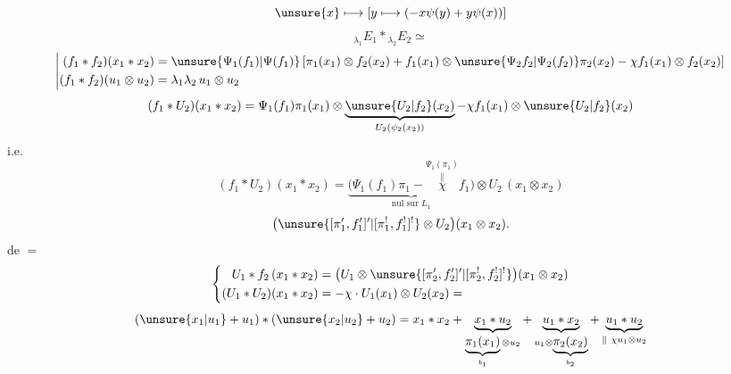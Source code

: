 \[
\unsure{x}\longmapsto
\left[y\longmapsto(-x\psi(y)+y\psi(x))\right]
\]
\[
{}_{\lambda_1}E_1*{}_{\lambda_2}E_2\simeq
\]
\[
\left|\begin{aligned}
(f_1*f_2)(x_1*x_2)&=\unsure{\Psi_1(f_1)|\Psi(f_1)}
\left[\pi_1(x_1)\otimes f_2(x_2)+f_1(x_1)\otimes
\unsure{\Psi_2 f_2|\Psi_2(f_2)}\pi_2(x_2)-\chi f_1(x_1)\otimes f_2(x_2)\right]\\
(f_1*f_2)(u_1\otimes u_2)&=\lambda_1\lambda_2\,u_1\otimes u_2
\end{aligned}\right.
\]
\[
(f_1*U_2)(x_1*x_2)=\Psi_1(f_1)\pi_1(x_1)\otimes
\underbrace{\unsure{U_2|f_2}(x_2)}_{U_2(\psi_2(x_2))}
-\chi f_1(x_1)\otimes\unsure{U_2|f_2}(x_2)
\]
i.e.
\[
(f_1*U_2)(x_1*x_2)=
\underbrace{\bigl(\Psi_1(f_1)\pi_1-\overset{\Psi_1(\pi_1)}{\overset{\Vert}{\chi}}f_1\bigr)}_{\text{nul sur }L_1}
\otimes U_2\,(x_1\otimes x_2)
\]
\[
\bigl(\unsure{[\pi'_1,f'_1]'|[\pi_1^!,f_1^!]^!}\otimes U_2\bigr)(x_1\otimes x_2).
\]
de \(=\)
\[
\left\{\begin{aligned}
U_1*f_2\,(x_1*x_2)&=
\bigl(U_1\otimes\unsure{[\pi'_2,f'_2]'|[\pi_2^!,f_2^!]^!}\bigr)(x_1\otimes x_2)\\
(U_1*U_2)(x_1*x_2)&=-\chi\cdot U_1(x_1)\otimes U_2(x_2)=
\end{aligned}\right.
\]
\[
(\unsure{x_1|u_1}+u_1)*(\unsure{x_2|u_2}+u_2)
=x_1*x_2+\underbrace{x_1*u_2}_{\underbrace{\pi_1(x_1)}_{b_1}\otimes u_2}
+\underbrace{u_1*x_2}_{u_1\otimes\underbrace{\pi_2(x_2)}_{b_2}}
+\underbrace{u_1*u_2}_{\Vert\ \chi u_1\otimes u_2}
\]
